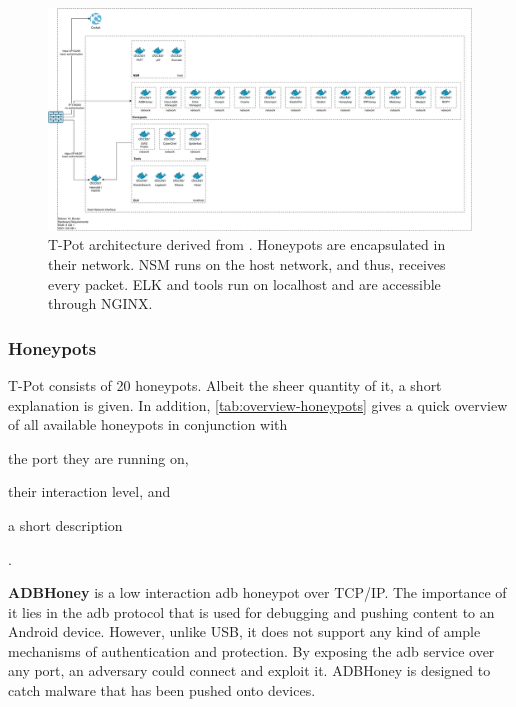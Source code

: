 \begin{figure}
    \centering
    \includegraphics[width=\textwidth]{figures/tpot-architecture.pdf}
    \caption[T-Pot architecture]{
        T-Pot architecture derived from \cite{tpot2021}.
        Honeypots are encapsulated in their network.
        NSM runs on the host network, and thus, receives every packet.
        ELK and tools run on localhost and are accessible through NGINX.
    }
    \label{fig:overview-tpot}
\end{figure}

\subsubsection{Honeypots}

T-Pot consists of 20 honeypots. Albeit the sheer quantity of it, a short explanation is given.
In addition, \autoref{tab:overview-honeypots} gives a quick overview of all available honeypots in conjunction with
\begin{enumerate*}[label=(\roman*)]
    \item the port they are running on,
    \item their interaction level, and
    \item a short description
\end{enumerate*}.

\textbf{ADBHoney} \cite{adbhoney2021} is a low interaction \ac{adb} honeypot over TCP/IP.
The importance of it lies in the \ac{adb} protocol that is used for debugging and pushing content to an Android device.
However, unlike USB, it does not support any kind of ample mechanisms of authentication and protection.
By exposing the \ac{adb} service over any port, an adversary could connect and exploit it.
ADBHoney is designed to catch malware that has been pushed onto devices.

